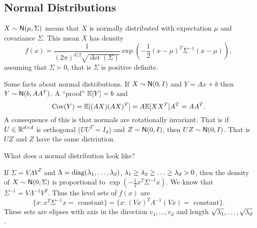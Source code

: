 \subsection{Normal Distributions}
$X \sim {\mathsf{N}}(\mu,\Sigma)$ means that $X$ is normally distributed with expectation $\mu$ and covariance $\Sigma$. This mean $X$ has density
\[f(x) = \frac{1}{(2\pi)^{d/2}\sqrt{\det(\Sigma)}}\exp\left(-\frac{1}{2}(x-\mu)^T\Sigma^{-1}(x-\mu)\right),\]
assuming that $\Sigma \succ 0$, that is $\Sigma$ is positive definite.

Some facts about normal distributions. If $X \sim {\mathsf{N}}(0,I)$ and $Y=Ax+b$ then $Y \sim {\mathsf{N}}(b, AA^T)$. A ``proof'' ${\mathbb{E}}[Y] = b$ and 
\[\text{Cov}(Y) = {\mathbb{E}}[(AX)(AX)^T] = A{\mathbb{E}}[XX^T]A^T = AA^T.\]
A consequence of this is that normals are rotationally invariant. That is if $U \in {\mathbb R}^{d\times d}$ is orthogonal ($UU^T = I_d$) and $Z \sim {\mathsf{N}}(0,I)$, then $UZ \sim {\mathsf{N}}(0,I)$. That is $UZ$ and $Z$ have the same distriution.

What does a normal distribution look like?

If $\Sigma = V \Lambda V^T$ and $\Lambda = \operatorname*{diag}(\lambda_1,\ldots, \lambda_d)$, $\lambda_1 \ge \lambda_2 \ge \ldots \ge \lambda_d > 0$, then the density of $X \sim {\mathsf{N}}(0,\Sigma)$ is proportional to $\exp\left(-\frac{1}{2} x^T \Sigma^{-1} x\right)$. We know that $\Sigma^{-1} = V\Lambda^{-1} V^T$. Thus the level sets of $f(x)$ are 
\[\{x : x^T \Sigma^{-1} x = \text{ constant} \} = \{x : (Vx)^T\Lambda^{-1} (Vx) = \text{ constant} \}.   \]
These sets are elipses with axis in the direction $v_1,\ldots, v_d$ and length $\sqrt{\lambda_1}, \ldots, \sqrt{\lambda_d}$.
